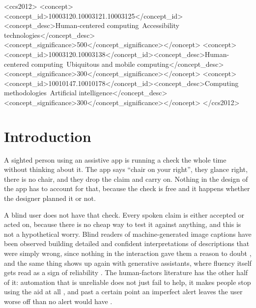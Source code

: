 \documentclass[sigconf,nonacm]{acmart}
\begin{document}
\begin{CCSXML}
<ccs2012>
<concept><concept_id>10003120.10003121.10003125</concept_id><concept_desc>Human-centered computing~Accessibility technologies</concept_desc><concept_significance>500</concept_significance></concept>
<concept><concept_id>10003120.10003138</concept_id><concept_desc>Human-centered computing~Ubiquitous and mobile computing</concept_desc><concept_significance>300</concept_significance></concept>
<concept><concept_id>10010147.10010178</concept_id><concept_desc>Computing methodologies~Artificial intelligence</concept_desc><concept_significance>300</concept_significance></concept>
</ccs2012>
\end{CCSXML}


\maketitle

\section{Introduction}

A sighted person using an assistive app is running a check the whole time
without thinking about it. The app says ``chair on your right'', they glance
right, there is no chair, and they drop the claim and carry on. Nothing in the
design of the app has to account for that, because the check is free and it
happens whether the designer planned it or not.

A blind user does not have that check. Every spoken claim is either accepted or
acted on, because there is no cheap way to test it against anything, and this is
not a hypothetical worry. Blind readers of machine-generated image captions have
been observed building detailed and confident interpretations of descriptions
that were simply wrong, since nothing in the interaction gave them a reason to
doubt \cite{macleod2017captions}, and the same thing shows up again with
generative assistants, where fluency itself gets read as a sign of reliability
\cite{adnin2024genai,stangl2020descriptions}. The human-factors literature has
the other half of it: automation that is unreliable does not just fail to help,
it makes people stop using the aid at all \cite{parasuraman1997misuse,lee2004trust},
and past a certain point an imperfect alert leaves the user worse off than no
alert would have \cite{wickens2007imperfect,breznitz1984crywolf}.
\end{document}
